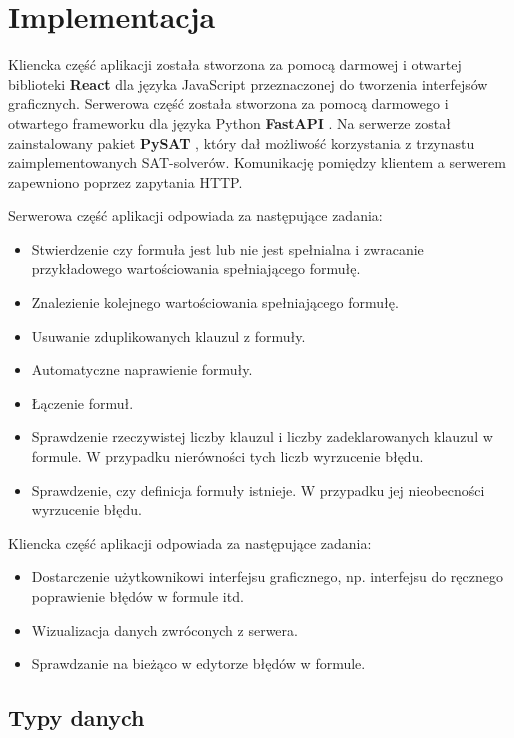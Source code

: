 \documentclass[a4paper,12pt]{book}
\theoremstyle{definition}
\begin{document}
\chapter{Implementacja}

Kliencka część aplikacji została stworzona za pomocą darmowej i otwartej biblioteki \textbf{React} \cite{reactdocs} dla języka JavaScript przeznaczonej do tworzenia interfejsów graficznych. Serwerowa część została stworzona za pomocą darmowego i otwartego frameworku dla języka Python \textbf{FastAPI} \cite{fastapidocs}. Na serwerze został zainstalowany pakiet \textbf{PySAT} \cite{pysatdocs}, który dał możliwość korzystania z trzynastu zaimplementowanych SAT-solverów. Komunikację pomiędzy klientem a serwerem zapewniono poprzez zapytania HTTP.

Serwerowa część aplikacji odpowiada za następujące zadania:

\begin{itemize}
    \item Stwierdzenie czy formuła jest lub nie jest spełnialna i zwracanie przykładowego wartościowania spełniającego formułę.
    \item Znalezienie kolejnego wartościowania spełniającego formułę.
    \item Usuwanie zduplikowanych klauzul z formuły.
    \item Automatyczne naprawienie formuły.
    \item Łączenie formuł.
    \item Sprawdzenie rzeczywistej liczby klauzul i liczby zadeklarowanych klauzul w formule. W przypadku nierówności tych liczb wyrzucenie błędu.
    \item Sprawdzenie, czy definicja formuły istnieje. W przypadku jej nieobecności wyrzucenie błędu.
\end{itemize}

Kliencka część aplikacji odpowiada za następujące zadania:

\begin{itemize}
    \item Dostarczenie użytkownikowi interfejsu graficznego, np. interfejsu do ręcznego poprawienie błędów w formule itd.
    \item Wizualizacja danych zwróconych z serwera.
    \item Sprawdzanie na bieżąco w edytorze błędów w formule.
\end{itemize}

\section{Typy danych}
\end{document}

